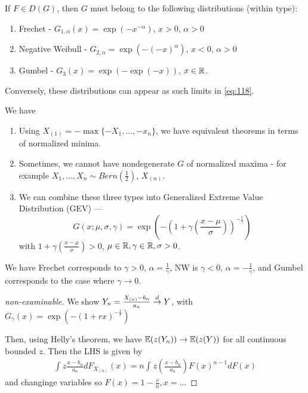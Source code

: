 \begin{thm}
  \label{defn:extreme_value_theory:3}
  If $F \in D(G)$, then $G$ must belong to the following distributions
  (within type):

  \begin{enumerate}
  \item Frechet - $G_{1, \alpha}(x) = \exp(-x^{-\alpha})$, $x > 0$,
    $\alpha > 0$
  \item Negative Weibull - $G_{2, \alpha} = \exp(- (-x)^{\alpha})$, $x
    < 0$, $\alpha > 0$
  \item Gumbel - $G_{3}(x) = \exp(-\exp(-x))$, $x \in \mathbb{R}$.
  \end{enumerate}

  Conversely, these distributions can appear as such limits in \eqref{eq:118}.
\end{thm}

\begin{remark}
  We have
  \begin{enumerate}
  \item Using $X_{(1)} = -\max \{ -X_{1}, \dots, -x_{n} \} $, we have
    equivalent theorems in terms of normalized minima.
  \item Sometimes, we cannot have nondegenerate $G$ of normalized
    maxima  - for example $X_{1}, \dots, X_{n} \sim
    Bern(\frac{1}{2})$, $X_{(n)}$.
  \item We can combine these three types into Generalized Extreme
    Value Distribution (GEV) ---
    \begin{equation}
      \label{eq:122}
      G(x; \mu, \sigma, \gamma) = \exp(- (1 + \gamma(\frac{x-\mu}{\sigma}))^{-\frac{1}{\gamma}})
    \end{equation} with $1 + \gamma(\frac{x - \mu}{\sigma}) > 0$, $\mu
    \in \mathbb{R}, \gamma \in \mathbb{R}, \sigma > 0$.
  \end{enumerate}

  We have Frechet corresponds to $\gamma > 0$, $\alpha =
  \frac{1}{\gamma} $, NW is $\gamma < 0$, $\alpha =
  -\frac{1}{\gamma}$, and Gumbel corresponds to the case where $\gamma
  \rightarrow 0$.
\end{remark}

\begin{proof}[non-examinable]
  We show $Y_{n} = \frac{X_{(n)} - b_{n}}{a_{n}} \overset{d}{\rightarrow} Y$, with
  $G_{\gamma}(x) = \exp(- (1 + rx)^{-\frac{1}{r}})$

  Then, using Helly's theorem, we have $\E{z(Y_{n})} \rightarrow
  \E{z(Y)}$ for all continuous bounded $z$.  Then the LHS is given by
  \begin{align}
    \label{eq:123}
    \int_{}^{} z \frac{x - b_{n}}{a_{n}} d F_{X_{(n)}}(x) = n
    \int_{}^{} z(\frac{x - b_{n}}{a_{n}}) F(x)^{n-1} dF(x)
  \end{align} and changinge variables so $F(x) = 1 - \frac{v}{n}, x = \dots$
\end{proof}

